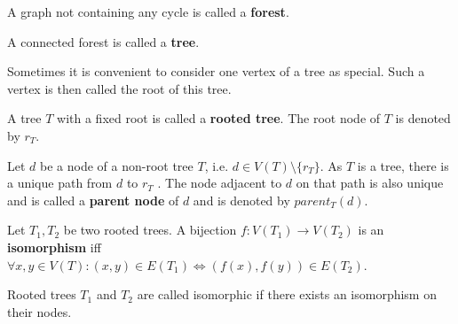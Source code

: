 \begin{definition}
  A graph not containing any cycle is called a {\bf forest}.
\end{definition}

\begin{definition}
  A connected forest is called a {\bf tree}.
\end{definition}

Sometimes it is convenient to consider one vertex of a tree as special. Such a vertex is then called the root of this tree.

\begin{definition}
  A tree $T$ with a fixed root is called a {\bf rooted tree}. The root node of $T$ is denoted by $r_T$.
\end{definition}

\begin{definition}
  Let $d$ be a node of a non-root tree $T$, i.e. $d\in V(T)\setminus \{r_T\}$. As $T$ is a tree, there is a unique path from $d$ to $r_T$ \cite{Diestel97Graphs}. The node adjacent to $d$ on that path is also unique and is called a {\bf parent node} of $d$ and is denoted by $parent_T(d)$.
\end{definition}

\begin{definition}
  Let $T_1, T_2$ be two rooted trees. A bijection $f: V(T_1)\rightarrow V(T_2)$ is an {\bf isomorphism} iff $\forall x,y\in V(T): (x,y)\in E(T_1)\Leftrightarrow (f(x), f(y))\in E(T_2)$.
\end{definition}

Rooted trees $T_1$ and $T_2$ are called isomorphic if there exists an isomorphism on their nodes.
